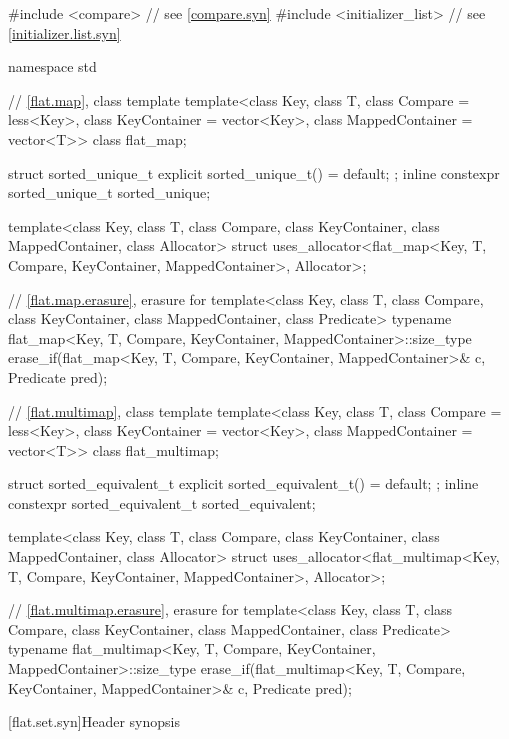 %
\begin{codeblock}
#include <compare>              // see \ref{compare.syn}
#include <initializer_list>     // see \ref{initializer.list.syn}

namespace std {
  // \ref{flat.map}, class template 
  template<class Key, class T, class Compare = less<Key>,
           class KeyContainer = vector<Key>, class MappedContainer = vector<T>>
    class flat_map;

  struct sorted_unique_t { explicit sorted_unique_t() = default; };
  inline constexpr sorted_unique_t sorted_unique{};

  template<class Key, class T, class Compare, class KeyContainer, class MappedContainer,
           class Allocator>
    struct uses_allocator<flat_map<Key, T, Compare, KeyContainer, MappedContainer>,
                          Allocator>;

  // \ref{flat.map.erasure}, erasure for 
  template<class Key, class T, class Compare, class KeyContainer, class MappedContainer,
           class Predicate>
    typename flat_map<Key, T, Compare, KeyContainer, MappedContainer>::size_type
      erase_if(flat_map<Key, T, Compare, KeyContainer, MappedContainer>& c, Predicate pred);

  // \ref{flat.multimap}, class template 
  template<class Key, class T, class Compare = less<Key>,
           class KeyContainer = vector<Key>, class MappedContainer = vector<T>>
    class flat_multimap;

  struct sorted_equivalent_t { explicit sorted_equivalent_t() = default; };
  inline constexpr sorted_equivalent_t sorted_equivalent{};

  template<class Key, class T, class Compare, class KeyContainer, class MappedContainer,
           class Allocator>
    struct uses_allocator<flat_multimap<Key, T, Compare, KeyContainer, MappedContainer>,
                          Allocator>;

  // \ref{flat.multimap.erasure}, erasure for 
  template<class Key, class T, class Compare, class KeyContainer, class MappedContainer,
           class Predicate>
    typename flat_multimap<Key, T, Compare, KeyContainer, MappedContainer>::size_type
      erase_if(flat_multimap<Key, T, Compare, KeyContainer, MappedContainer>& c, Predicate pred);
}
\end{codeblock}

[flat.set.syn]{Header  synopsis}%
%

